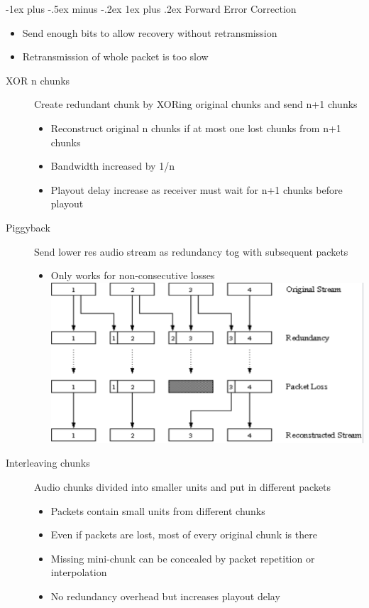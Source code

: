 \documentclass{article}
\makeatletter
\renewcommand{\subsubsection}{\@startsection{subsubsection}{3}{0mm}%
    {-1ex plus -.5ex minus -.2ex}%
    {1ex plus .2ex}%
{\normalfont\small\bfseries}}%
\makeatother
\begin{document}
\begin{multicols*}{4}
\subsubsection{Forward Error Correction}
\begin{itemize}
	\item Send enough bits to allow recovery without retransmission
	\item Retransmission of whole packet is too slow 
\end{itemize}
\begin{description}
	\item[XOR n chunks]{Create redundant chunk by XORing original chunks and send n+1 chunks}
	\begin{itemize}
		\item Reconstruct original n chunks if at most one lost chunks from n+1 chunks
		\item Bandwidth increased by 1/n
		\item Playout delay increase as receiver must wait for n+1 chunks before playout
	\end{itemize}
	\item[Piggyback]{Send lower res audio stream as redundancy tog with subsequent packets}
	\begin{itemize}
		\item Only works for non-consecutive losses
		\includegraphics[scale=0.2]{piggyback-voip-loss}
	\end{itemize}
	\item[Interleaving chunks]{Audio chunks divided into smaller units and put in different packets}
	\begin{itemize}
		\item Packets contain small units from different chunks
		\item Even if packets are lost, most of every original chunk is there
		\item Missing mini-chunk can be concealed by packet repetition or interpolation
		\item No redundancy overhead but increases playout delay 
	\end{itemize}
\end{description}

\end{multicols*}
\end{document}
